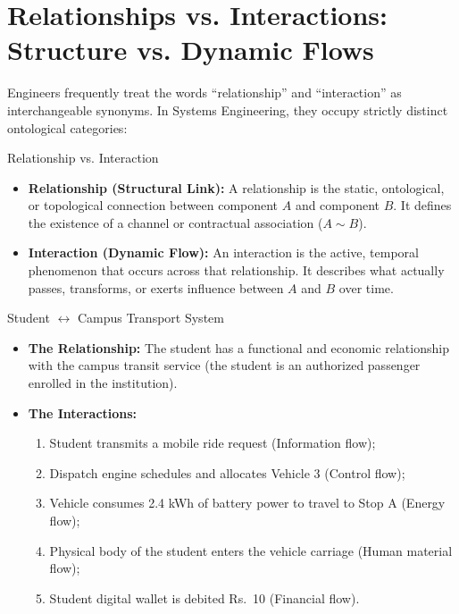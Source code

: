 \section{Relationships vs. Interactions: Structure vs. Dynamic Flows}
\label{sec:rel_vs_inter}

Engineers frequently treat the words ``relationship'' and ``interaction'' as interchangeable synonyms. In Systems Engineering, they occupy strictly distinct ontological categories:

\begin{definitionbox}{Relationship vs. Interaction}
\begin{itemize}[leftmargin=1.5em]
    \item \textbf{Relationship (Structural Link):} A relationship is the static, ontological, or topological connection between component $A$ and component $B$. It defines the existence of a channel or contractual association ($A \sim B$).
    \item \textbf{Interaction (Dynamic Flow):} An interaction is the active, temporal phenomenon that occurs across that relationship. It describes what actually passes, transforms, or exerts influence between $A$ and $B$ over time.
\end{itemize}
\end{definitionbox}

\begin{examplebox}{Student $\leftrightarrow$ Campus Transport System}
\begin{itemize}[leftmargin=1.5em]
    \item \textbf{The Relationship:} The student has a functional and economic relationship with the campus transit service (the student is an authorized passenger enrolled in the institution).
    \item \textbf{The Interactions:}
    \begin{enumerate}[label=(\alph*), itemsep=1pt]
        \item Student transmits a mobile ride request (Information flow);
        \item Dispatch engine schedules and allocates Vehicle 3 (Control flow);
        \item Vehicle consumes 2.4 kWh of battery power to travel to Stop A (Energy flow);
        \item Physical body of the student enters the vehicle carriage (Human material flow);
        \item Student digital wallet is debited Rs.~10 (Financial flow).
    \end{enumerate}
\end{itemize}
\end{examplebox}

